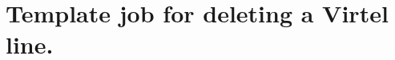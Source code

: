 \documentclass[letterpaper,10pt,english]{sphinxmanual}
\begin{document}
\begin{sphinxVerbatim}[commandchars=\\\{\}]
                                                      
                                                          
                                                              
                                                            
                                                            
\end{sphinxVerbatim}


\section{Template job for deleting a Virtel line.}
\label{\detokenize{TN202002:template-job-for-deleting-a-virtel-line}}
\end{document}
